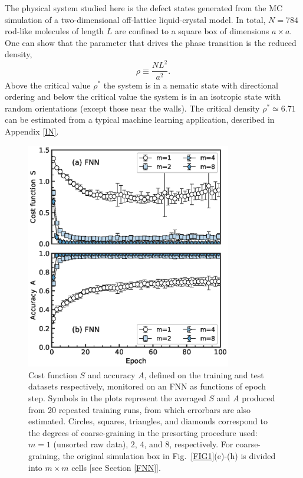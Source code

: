 The physical system studied here is the defect states generated from the MC simulation of a two-dimensional off-lattice liquid-crystal model. In total, $N=784$ rod-like molecules of length $L$ are confined to a square box of dimensions $a\times a$. One can show that the parameter that drives the phase transition is the reduced density,
\begin{equation}\label{rho}
    \rho \equiv \frac{NL^2}{a^2}.
\end{equation}
Above the critical value $\rho^*$ the system is in a nematic state with directional ordering and below the critical value the system is in an isotropic state with random orientations (except those near the walls). The critical density $\rho^*\simeq 6.71$ can be estimated from a typical machine learning application, described in Appendix \ref{IN}.

\begin{figure}
\centering
\includegraphics[width=0.8\textwidth]{./figs/FIG3AB.eps}
\caption{Cost function $S$ and accuracy $A$, defined on the training and test datasets respectively, monitored on an FNN as functions of epoch step. Symbols in the plots represent the averaged $S$ and $A$ produced from 20 repeated training runs, from which errorbars are also estimated. Circles, squares, triangles, and diamonds correspond to the degrees of coarse-graining in the presorting procedure used: $m=1$ (unsorted raw data), $2$, 4, and 8, respectively. For coarse-graining, the original simulation box in Fig.\ \ref{FIG1}(e)-(h) is divided into $m\times m$ cells [see Section \ref{FNN}].
}
\label{fnn_SA}
\end{figure}

